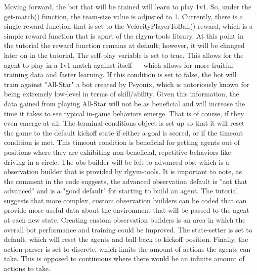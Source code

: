 \documentclass[10pt,twocolumn]{article}
\begin{document}
Moving forward, the bot that will be trained will learn to play 1v1. So, under the get-match() function, the team-size value is adjusted to 1. Currently, there is a single reward-function that is set to the VelocityPlayerToBall() reward, which is a simple reward function that is apart of the rlgym-tools library. At this point in the tutorial the reward function remains at default; however, it will be changed later on in the tutorial. The self-play variable is set to true. This allows for the agent to play in a 1v1 match against itself — which allows for more fruitful training data and faster learning. If this condition is set to false, the bot will train against "All-Star" a bot created by Psyonix, which is notoriously known for being extremely low-level in terms of skill/ability. Given this information, the data gained from playing All-Star will not be as beneficial and will increase the time it takes to see typical in-game behaviors emerge. That is of course, if they even emerge at all. The terminal-conditions object is set up so that it will reset the game to the default kickoff state if either a goal is scored, or if the timeout condition is met. This timeout condition is beneficial for getting agents out of positions where they are exhibiting non-beneficial, repetitive behaviors like driving in a circle. The obs-builder will be left to advanced obs, which is a observation builder that is provided by rlgym-tools. It is important to note, as the comment in the code suggests, the advanced observation default is "not that advanced" and is a "good default" for starting to build an agent. The tutorial suggests that more complex, custom observation builders can be coded that can provide more useful data about the environment that will be passed to the agent at each new state. Creating custom observation builders is an area in which the overall bot performance and training could be improved. The state-setter is set to default, which will reset the agents and ball back to kickoff position. Finally, the action parser is set to discrete, which limits the amount of actions the agents can take. This is opposed to continuous where there would be an infinite amount of actions to take.
\end{document}

